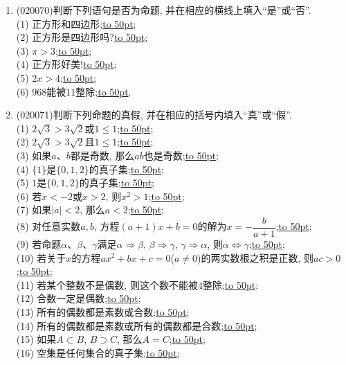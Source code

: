 \documentclass[10pt,a4paper]{article}
\newcommand{\blank}[1]{\underline{\hbox to #1pt{}}}
\begin{document}
\begin{enumerate}[1.]
\begin{center}
\end{center}
\item {\tiny (020070)}判断下列语句是否为命题, 并在相应的横线上填入``是''或``否''.\\
(1) 正方形和四边形;\blank{50};\\
(2) 正方形是四边形吗?\blank{50};\\
(3) $\pi>3$;\blank{50};\\
(4) 正方形好美!\blank{50};\\
(5) $2x>4$;\blank{50};\\
(6) $968$能被$11$整除;\blank{50}.
\item {\tiny (020071)}判断下列命题的真假, 并在相应的括号内填入``真''或``假''.\\
(1) $2\sqrt 3>3\sqrt 2$或$1\le 1$;\blank{50};\\
(2) $2\sqrt 3>3\sqrt 2$且$1\le1$;\blank{50};\\
(3) 如果$a$、$b$都是奇数, 那么$ab$也是奇数;\blank{50};\\
(4) $\{1\}$是$\{0, 1, 2\}$的真子集;\blank{50};\\
(5) $1$是$\{0, 1, 2\}$的真子集;\blank{50};\\
(6) 若$x<-2$或$x>2$, 则$x^2>1$;\blank{50};\\
(7) 如果$|a|<2$, 那么$a<2$;\blank{50};\\
(8) 对任意实数$a,b$, 方程$(a+1)x+b=0$的解为$x=-\dfrac b{a+1}$;\blank{50};\\
(9) 若命题$\alpha$、$\beta$、$\gamma$满足$\alpha\Rightarrow \beta$, $\beta\Rightarrow \gamma$, $\gamma\Rightarrow \alpha$, 则$\alpha\Leftrightarrow \gamma$;\blank{50};\\
(10) 若关于$x$的方程$ax^2+bx+c=0$($a\ne 0$)的两实数根之积是正数, 则$ac>0$;\blank{50};\\
(11) 若某个整数不是偶数, 则这个数不能被$4$整除;\blank{50};\\
(12) 合数一定是偶数;\blank{50};\\
(13) 所有的偶数都是素数或合数;\blank{50};\\
(14) 所有的偶数都是素数或所有的偶数都是合数;\blank{50};\\
(15) 如果$A\subset B$, $B\supset C$, 那么$A=C$;\blank{50};\\
(16) 空集是任何集合的真子集;\blank{50};\\

\end{enumerate}
\end{document}
